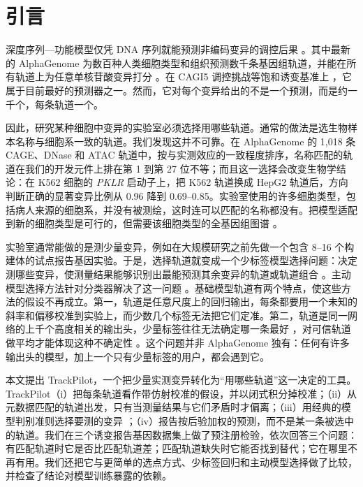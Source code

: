 \documentclass[webpdf,contemporary,large]{oup-authoring-template}
\newcommand{\tp}{TrackPilot}
\begin{document}
\section{引言}

深度序列—功能模型仅凭 DNA 序列就能预测非编码变异的调控后果
\citep{zhou2015deepsea,avsec2021enformer,linder2025borzoi}。其中最新的 AlphaGenome 为数百种人类细胞类型和组织预测数千条基因组轨道，并能在所有轨道上为任意单核苷酸变异打分 \citep{avsec2026alphagenome}。在 CAGI5 调控挑战等饱和诱变基准上 \citep{kircher2019saturation,shigaki2019cagi5}，它属于目前最好的预测器之一。然而，它对每个变异给出的不是一个预测，而是约一千个，每条轨道一个。

因此，研究某种细胞中变异的实验室必须选择用哪些轨道。通常的做法是选生物样本名称与细胞系一致的轨道。我们发现这并不可靠。在 AlphaGenome 的 1,018 条 CAGE、DNase 和 ATAC 轨道中，按与实测效应的一致程度排序，名称匹配的轨道在我们的开发元件上排在第 1 到第 27 位不等；而且这一选择会改变生物学结论：在 K562 细胞的 \textit{PKLR} 启动子上，把 K562 轨道换成 HepG2 轨道后，方向判断正确的显著变异比例从 0.96 降到 0.69--0.85。实验室使用的许多细胞类型，包括病人来源的细胞系，并没有被测绘，这时连可以匹配的名称都没有。把模型适配到新的细胞类型是可行的，但需要该细胞类型的全基因组图谱 \citep{hingerl2025scooby}。

实验室通常能做的是测少量变异，例如在大规模研究之前先做一个包含 8--16 个构建体的试点报告基因实验。于是，选择轨道就变成一个少标签模型选择问题：决定测哪些变异，使测量结果能够识别出最能预测其余变异的轨道或轨道组合 \citep{cohn1996active}。主动模型选择方法针对分类器解决了这一问题 \citep{karimi2021modelpicker,okanovic2025modelselector,kay2025coda}。基础模型轨道有两个特点，使这些方法的假设不再成立。第一，轨道是任意尺度上的回归输出，每条都要用一个未知的斜率和偏移校准到实验上，而少数几个标签无法把它们定准。第二，轨道是同一网络的上千个高度相关的输出头，少量标签往往无法确定哪一条最好 \citep{kuboyama2026labels}，对可信轨道做平均才能体现这种不确定性 \citep{hoeting1999bma}。这个问题并非 AlphaGenome 独有：任何有许多输出头的模型，加上一个只有少量标签的用户，都会遇到它。

本文提出 \tp{}，一个把少量实测变异转化为“用哪些轨道”这一决定的工具。\tp{}（i）把每条轨道看作带仿射校准的假设，并以闭式积分掉校准；（ii）从元数据匹配的轨道出发，只有当测量结果与它们矛盾时才偏离；（iii）用经典的模型判别准则选择要测的变异 \citep{box1967discrimination}；（iv）报告按后验加权的预测，而不是某一条被选中的轨道。我们在三个诱变报告基因数据集上做了预注册检验，依次回答三个问题：有匹配轨道时它是否比匹配轨道差；匹配轨道缺失时它能否找到替代；它在哪里不再有用。我们还把它与更简单的选点方式、少标签回归和主动模型选择做了比较，并检查了结论对模型训练暴露的依赖。
\end{document}
